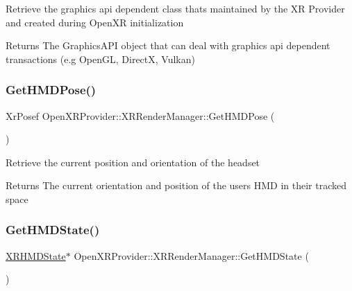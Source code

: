 Retrieve the graphics api dependent class that\textquotesingle{}s maintained by the XR Provider and created during Open\+XR initialization \begin{DoxyReturn}{Returns}
The Graphics\+A\+PI object that can deal with graphics api dependent transactions (e.\+g Open\+GL, DirectX, Vulkan) 
\end{DoxyReturn}
\mbox{\label{class_open_x_r_provider_1_1_x_r_render_manager_a2084c0ea8252e8b601b1bfcdd776f97d}} 
\subsubsection{\texorpdfstring{GetHMDPose()}{GetHMDPose()}}
{\footnotesize\ttfamily Xr\+Posef Open\+X\+R\+Provider\+::\+X\+R\+Render\+Manager\+::\+Get\+H\+M\+D\+Pose (\begin{DoxyParamCaption}{ }\end{DoxyParamCaption})}

Retrieve the current position and orientation of the headset \begin{DoxyReturn}{Returns}
The current orientation and position of the user\textquotesingle{}s H\+MD in their tracked space 
\end{DoxyReturn}
\mbox{\label{class_open_x_r_provider_1_1_x_r_render_manager_af6289267e9bf20f6e4d65e4051dd9944}} 
\subsubsection{\texorpdfstring{GetHMDState()}{GetHMDState()}}
{\footnotesize\ttfamily \mbox{\hyperlink{struct_open_x_r_provider_1_1_x_r_h_m_d_state}{X\+R\+H\+M\+D\+State}}$\ast$ Open\+X\+R\+Provider\+::\+X\+R\+Render\+Manager\+::\+Get\+H\+M\+D\+State (\begin{DoxyParamCaption}{ }\end{DoxyParamCaption})\hspace{0.3cm}{\ttfamily [inline]}}

